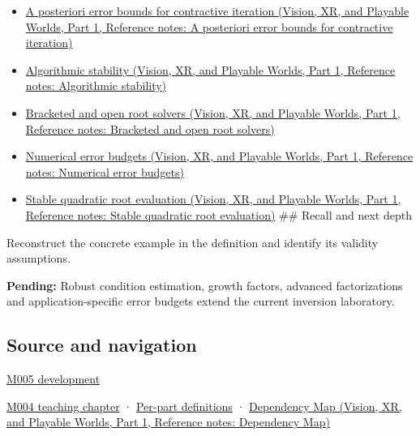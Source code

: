 \begin{itemize}
\tightlist
\item
  \href{../07-Vision-XR-and-Playable-Worlds-P01/main.pdf\#nameddest=appendix-d83b0ad1be7f}{A posteriori error bounds for contractive iteration (Vision, XR, and Playable Worlds, Part 1, Reference notes: A posteriori error bounds for contractive iteration)}
\item
  \href{../07-Vision-XR-and-Playable-Worlds-P01/main.pdf\#nameddest=appendix-aa2bf0d79639}{Algorithmic stability (Vision, XR, and Playable Worlds, Part 1, Reference notes: Algorithmic stability)}
\item
  \href{../07-Vision-XR-and-Playable-Worlds-P01/main.pdf\#nameddest=appendix-f63eb850796d}{Bracketed and open root solvers (Vision, XR, and Playable Worlds, Part 1, Reference notes: Bracketed and open root solvers)}
\item
  \href{../07-Vision-XR-and-Playable-Worlds-P01/main.pdf\#nameddest=appendix-31b8c295e05f}{Numerical error budgets (Vision, XR, and Playable Worlds, Part 1, Reference notes: Numerical error budgets)}
\item
  \href{../07-Vision-XR-and-Playable-Worlds-P01/main.pdf\#nameddest=appendix-b9afba7f63e5}{Stable quadratic root evaluation (Vision, XR, and Playable Worlds, Part 1, Reference notes: Stable quadratic root evaluation)} \#\# Recall and next depth
\end{itemize}

Reconstruct the concrete example in the definition and identify its validity assumptions.

\textbf{Pending:} Robust condition estimation, growth factors, advanced factorizations and application-specific error budgets extend the current inversion laboratory.

\subsection{Source and navigation}\label{appendix-8f6a01f284a7-source-and-navigation}

\hypertarget{appendix-8f6a01f284a7-source-and-navigation}{}

\hyperref[01-foundations-i-ch001-when-arithmetic-meets-uncertainty]{M005 development}

\hyperref[01-foundations-i-ch001-a-stretching-ruler-for-real-valued-quantities]{M004 teaching chapter} · \hyperref[appendix-fd090d982a15-m004---parts-61-76]{Per-part definitions} · \href{../07-Vision-XR-and-Playable-Worlds-P01/main.pdf\#nameddest=appendix-4ad47bdd269a}{Dependency Map (Vision, XR, and Playable Worlds, Part 1, Reference notes: Dependency Map)}
